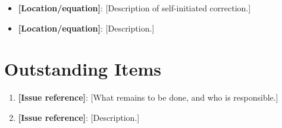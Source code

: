 \documentclass[11pt]{article}
\begin{document}
\begin{itemize}
    \item \textbf{[Location/equation]}: [Description of self-initiated correction.]
    \item \textbf{[Location/equation]}: [Description.]
\end{itemize}

%
%

\section*{Outstanding Items}

\begin{enumerate}
    \item \textbf{[Issue reference]}: [What remains to be done, and who is responsible.]
    \item \textbf{[Issue reference]}: [Description.]
\end{enumerate}
\end{document}
